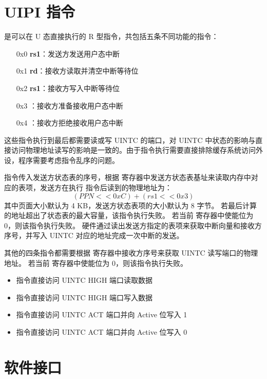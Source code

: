 \section{UIPI 指令}

\Iuipi 是可以在 U 态直接执行的 R 型指令，共包括五条不同功能的指令：

\begin{itemize}
    \item[0x0] \textbf{\Iuipisend rs1}：发送方发送用户态中断
    \item[0x1] \textbf{\Iuipiread rd}：接收方读取并清空中断等待位
    \item[0x2] \textbf{\Iuipiwrite rs1}：接收方写入中断等待位
    \item[0x3] \textbf{\Iuipiact}：接收方准备接收用户态中断
    \item[0x4] \textbf{\Iuipideact}：接收方拒绝接收用户态中断
\end{itemize}

这些指令执行到最后都需要读或写 UINTC 的端口，对 UINTC 中状态的影响与直接访问物理地址读写的影响是一致的。由于指令执行需要直接排除缓存系统访问外设，程序需要考虑指令乱序的问题。

\Iuipisend 指令传入发送方状态表的序号，根据 \Rsuist 寄存器中发送方状态表基址来读取内存中对应的表项，发送方在执行 \Iuipisend 指令后读到的物理地址为：
$$
( PPN << 0xC ) + ( rs1 << 0x3 )
$$
其中页面大小默认为 4 KB，发送方状态表项的大小默认为 8 字节。
若最后计算的地址超出了状态表的最大容量，该指令执行失败。
若当前 \Rsuist 寄存器中使能位为 0，则该指令执行失败。
硬件通过读出发送方指定的表项来获取中断向量和接收方序号，并写入 UINTC 对应的地址完成一次中断的发送。

其他的四条指令都需要根据 \Rsuirs 寄存器中接收方序号来获取 UINTC 读写端口的物理地址。
若当前 \Rsuirs 寄存器中使能位为 0，则该指令执行失败。

\begin{itemize}
    \item \Iuipiread 指令直接访问 UINTC HIGH 端口读取数据
    \item \Iuipiwrite 指令直接访问 UINTC HIGH 端口写入数据
    \item \Iuipiact 指令直接访问 UINTC ACT 端口并向 Active 位写入 1
    \item \Iuipideact 指令直接访问 UINTC ACT 端口并向 Active 位写入 0
\end{itemize}

\section{软件接口}

